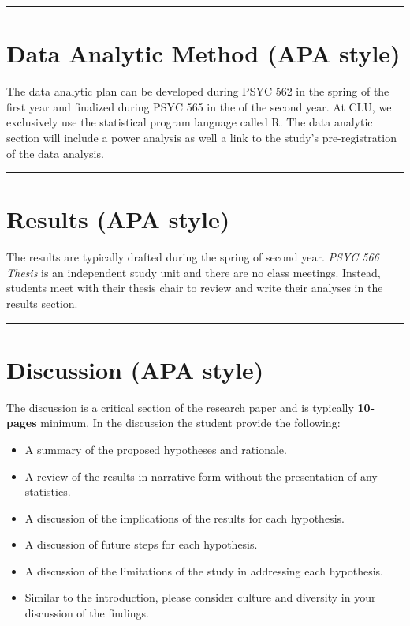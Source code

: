 \documentclass[openany]{book}
\providecommand{\tightlist}{%
  \setlength{\itemsep}{0pt}\setlength{\parskip}{0pt}}
\begin{document}
\begin{center}\rule{0.5\linewidth}{0.5pt}\end{center}

\hypertarget{data-analytic-method-apa-style}{%
\section{Data Analytic Method (APA style)}\label{data-analytic-method-apa-style}}

The data analytic plan can be developed during PSYC 562 in the spring of the first year and finalized during PSYC 565 in the of the second year. At CLU, we exclusively use the statistical program language called R. The data analytic section will include a power analysis as well a link to the study's pre-registration of the data analysis.

\begin{center}\rule{0.5\linewidth}{0.5pt}\end{center}

\hypertarget{results-apa-style}{%
\section{Results (APA style)}\label{results-apa-style}}

The results are typically drafted during the spring of second year. \emph{PSYC 566 Thesis} is an independent study unit and there are no class meetings. Instead, students meet with their thesis chair to review and write their analyses in the results section.

\begin{center}\rule{0.5\linewidth}{0.5pt}\end{center}

\hypertarget{discussion-apa-style}{%
\section{Discussion (APA style)}\label{discussion-apa-style}}

The discussion is a critical section of the research paper and is typically \textbf{10-pages} minimum. In the discussion the student provide the following:

\begin{itemize}
\tightlist
\item
  A summary of the proposed hypotheses and rationale.
\item
  A review of the results in narrative form without the presentation of any statistics.
\item
  A discussion of the implications of the results for each hypothesis.
\item
  A discussion of future steps for each hypothesis.
\item
  A discussion of the limitations of the study in addressing each hypothesis.
\item
  Similar to the introduction, please consider culture and diversity in your discussion of the findings.
\end{itemize}
\end{document}
